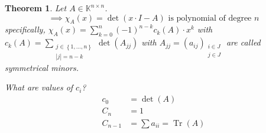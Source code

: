 \documentclass{article}
\newtheorem{theorem}{Theorem}  \numberwithin{theorem}{section}
\newcommand{\set}[1]{\left\{#1\right\}}
\begin{document}
\begin{theorem} %
  Let $A \in \mathbb K^{n \times n}$.
  \[ \implies \chi_A(x) = \det(x \cdot I - A) \text{ is polynomial of degree } n \]
  specifically, $\chi_A(x) = \sum_{k=0}^n (-1)^{n-k} c_k(A) \cdot x^k$ with $c_k(A) = \sum_{\substack{j \in \set{1, \dots, n} \\ |j| = n - k}} \det(A_{jj})$
  with $A_{jj} = (a_{ij})_{\substack{i \in J \\ j \in J}}$ are called \emph{symmetrical minors}.

  What are values of $c_i$?
  \begin{align*}
    c_0 &= \det(A) \\
    C_n &= 1 \\
    C_{n-1} &= \sum a_{ii} = \operatorname{Tr}(A)
  \end{align*}
\end{theorem}
\end{document}
